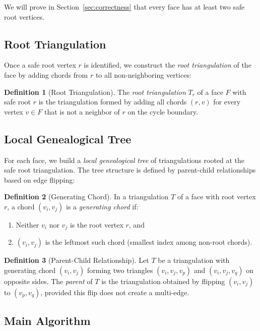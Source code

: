 \documentclass[12pt,a4paper]{article}
\theoremstyle{definition}
\newtheorem{definition}{Definition}
\theoremstyle{remark}
\begin{document}
We will prove in Section~\ref{sec:correctness} that every face has at least two safe root vertices.

\subsection{Root Triangulation}

Once a safe root vertex $r$ is identified, we construct the \emph{root triangulation} of the face by adding chords from $r$ to all non-neighboring vertices:

\begin{definition}[Root Triangulation]
The \emph{root triangulation} $T_r$ of a face $F$ with safe root $r$ is the triangulation formed by adding all chords $(r, v)$ for every vertex $v \in F$ that is not a neighbor of $r$ on the cycle boundary.
\end{definition}

\subsection{Local Genealogical Tree}

For each face, we build a \emph{local genealogical tree} of triangulations rooted at the safe root triangulation. The tree structure is defined by parent-child relationships based on edge flipping:

\begin{definition}[Generating Chord]
\label{def:generating_chord}
In a triangulation $T$ of a face with root vertex $r$, a chord $(v_i, v_j)$ is a \emph{generating chord} if:
\begin{enumerate}
    \item Neither $v_i$ nor $v_j$ is the root vertex $r$, and
    \item $(v_i, v_j)$ is the leftmost such chord (smallest index among non-root chords).
\end{enumerate}
\end{definition}

\begin{definition}[Parent-Child Relationship]
Let $T$ be a triangulation with generating chord $(v_i, v_j)$ forming two triangles $(v_i, v_j, v_p)$ and $(v_i, v_j, v_q)$ on opposite sides. The \emph{parent} of $T$ is the triangulation obtained by flipping $(v_i, v_j)$ to $(v_p, v_q)$, provided this flip does not create a multi-edge.
\end{definition}

\subsection{Main Algorithm}
\end{document}
